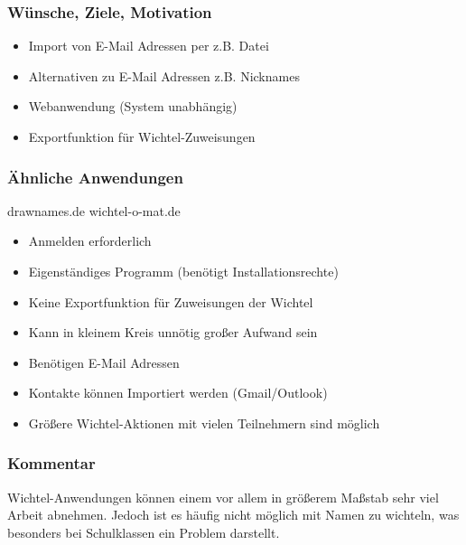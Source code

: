 \begin{minipage}[t][][b]{.45\textwidth}
\subsubsection*{Wünsche, Ziele, Motivation}%
\begin{itemize}[leftmargin=*]
\item Import von E-Mail Adressen per z.B. Datei
\item Alternativen zu E-Mail Adressen z.B. Nicknames
\item Webanwendung (System unabhängig)
\item Exportfunktion für Wichtel-Zuweisungen
\end{itemize}
\end{minipage}\hfill
%
\begin{minipage}[t][][b]{.45\textwidth}
\subsubsection*{Ähnliche Anwendungen}
drawnames.de wichtel-o-mat.de
\begin{itemize}[leftmargin=*,label={$-$}]
\item Anmelden erforderlich
\item Eigenständiges Programm (benötigt Installationsrechte)
\item Keine Exportfunktion für Zuweisungen der Wichtel
\item Kann in kleinem Kreis unnötig großer Aufwand sein
\item Benötigen E-Mail Adressen
\end{itemize}
\begin{itemize}[leftmargin=*,label={$+$}]
\item Kontakte können Importiert werden (Gmail/Outlook)
\item Größere Wichtel-Aktionen mit vielen Teilnehmern sind möglich
\end{itemize}
\end{minipage}\bigskip

\subsubsection*{Kommentar}
Wichtel-Anwendungen können einem vor allem in größerem Maßstab sehr viel Arbeit abnehmen. Jedoch ist es häufig nicht möglich mit Namen zu wichteln, was besonders bei Schulklassen ein Problem darstellt.
